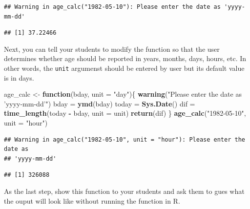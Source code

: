 \documentclass[]{book}
\newenvironment{Shaded}{\begin{snugshade}}{\end{snugshade}}
\newcommand{\ControlFlowTok}[1]{\textcolor[rgb]{0.13,0.29,0.53}{\textbf{#1}}}
\newcommand{\DataTypeTok}[1]{\textcolor[rgb]{0.13,0.29,0.53}{#1}}
\newcommand{\KeywordTok}[1]{\textcolor[rgb]{0.13,0.29,0.53}{\textbf{#1}}}
\newcommand{\NormalTok}[1]{#1}
\newcommand{\OperatorTok}[1]{\textcolor[rgb]{0.81,0.36,0.00}{\textbf{#1}}}
\newcommand{\StringTok}[1]{\textcolor[rgb]{0.31,0.60,0.02}{#1}}
\begin{document}
\begin{verbatim}
## Warning in age_calc("1982-05-10"): Please enter the date as 'yyyy-mm-dd'
\end{verbatim}

\begin{verbatim}
## [1] 37.22466
\end{verbatim}

Next, you can tell your students to modify the function so that the user determines whether age should be reported in years, months, days, hours, etc. In other words, the \texttt{unit} argumenst should be entered by user but its default value is in days.

\begin{Shaded}
\begin{Highlighting}[]
\NormalTok{age_calc <-}\StringTok{ }\ControlFlowTok{function}\NormalTok{(bday, }\DataTypeTok{unit =} \StringTok{"day"}\NormalTok{)\{}
    \KeywordTok{warning}\NormalTok{(}\StringTok{"Please enter the date as 'yyyy-mm-dd'"}\NormalTok{)}
\NormalTok{    bday =}\StringTok{ }\KeywordTok{ymd}\NormalTok{(bday)}
\NormalTok{    today =}\StringTok{ }\KeywordTok{Sys.Date}\NormalTok{()}
\NormalTok{    dif =}\StringTok{ }\KeywordTok{time_length}\NormalTok{(today }\OperatorTok{-}\StringTok{ }\NormalTok{bday, }\DataTypeTok{unit =}\NormalTok{ unit)}
    \KeywordTok{return}\NormalTok{(dif)}
\NormalTok{\}}
\KeywordTok{age_calc}\NormalTok{(}\StringTok{"1982-05-10"}\NormalTok{, }\DataTypeTok{unit =} \StringTok{"hour"}\NormalTok{)}
\end{Highlighting}
\end{Shaded}

\begin{verbatim}
## Warning in age_calc("1982-05-10", unit = "hour"): Please enter the date as
## 'yyyy-mm-dd'
\end{verbatim}

\begin{verbatim}
## [1] 326088
\end{verbatim}

As the last step, show this function to your students and ask them to gues what the ouput will look like without running the function in R.
\end{document}
